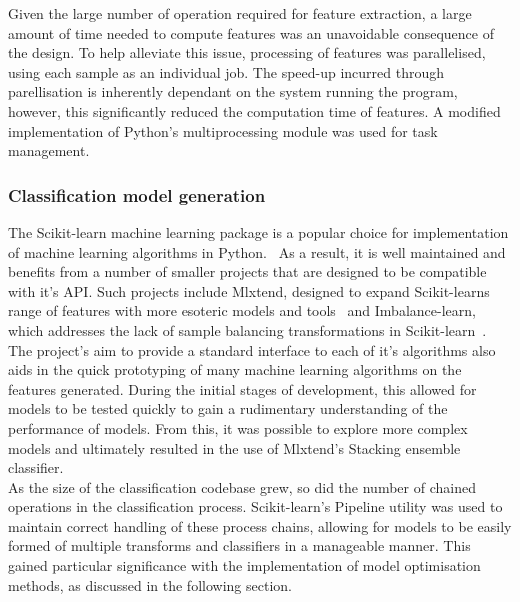 \documentclass[titlepage, 12pt]{scrartcl} \usepackage{enumitem}
\begin{document}
Given the large number of operation required for feature extraction, a large
amount of time needed to compute features was an unavoidable consequence of
the design. To help alleviate this issue, processing of features was
parallelised, using each sample as an individual job. The speed-up incurred
through parellisation is inherently dependant on the system running the
program, however, this significantly reduced the computation time of features.
A modified implementation of Python's multiprocessing module was used for task
management.

\subsubsection{Classification model generation}\label{Sklearn}
The Scikit-learn machine learning package is a popular choice for
implementation of machine learning algorithms in
Python.~\parencite{Pedregosa2011} As a result, it is well maintained and
benefits from a number of smaller projects that are designed to be compatible
with it's API. Such projects include Mlxtend, designed to expand Scikit-learns
range of features with more esoteric models and tools~\parencite{Raschka2016,}
and Imbalance-learn, which addresses the lack of sample balancing
transformations in Scikit-learn~\parencite{Lemaitre2017}. The project's aim to
provide a standard interface to each of it's algorithms also aids in the quick
prototyping of many machine learning algorithms on the features generated.
During the initial stages of development, this allowed for models to be tested
quickly to gain a rudimentary understanding of the performance of models. From
this, it was possible to explore more complex models and ultimately resulted in
the use of Mlxtend's Stacking ensemble classifier.\\

As the size of the classification codebase grew, so did the number of chained
operations in the classification process. Scikit-learn's Pipeline utility was
used to maintain correct handling of these process chains, allowing for models
to be easily formed of multiple transforms and classifiers in a manageable
manner. This gained particular significance with the implementation of model
optimisation methods, as discussed in the following section.
\end{document}

